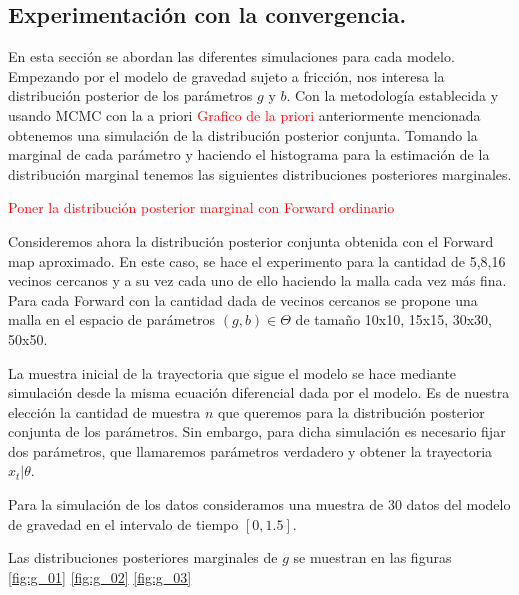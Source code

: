 \newpage

\newpage

\subsection{Experimentación con la convergencia.}

En esta sección se abordan las diferentes simulaciones para cada modelo. Empezando por el modelo de gravedad sujeto a fricción, nos interesa la distribución posterior de los parámetros $g$ y $b$. Con la metodología establecida y usando MCMC con la a priori \textcolor{red}{Grafico de la priori} anteriormente mencionada obtenemos una simulación de la distribución posterior conjunta. Tomando la marginal de cada parámetro y haciendo el histograma para la estimación de la distribución marginal tenemos las siguientes distribuciones posteriores marginales.


\textcolor{red}{Poner la distribución posterior marginal con Forward ordinario}

Consideremos ahora la distribución posterior conjunta obtenida con el Forward map aproximado. En este caso, se hace el experimento para la cantidad de 5,8,16 vecinos cercanos y a su vez cada uno de ello haciendo la malla cada vez más fina. Para cada Forward con la cantidad dada de vecinos cercanos se propone una malla en el espacio de parámetros $(g,b)\in \Theta$ de tamaño 10x10, 15x15, 30x30, 50x50.

La muestra inicial de la trayectoria que sigue el modelo se hace mediante simulación desde la misma ecuación diferencial dada por el modelo. Es de nuestra elección la cantidad de muestra $n$ que queremos para la distribución posterior conjunta de los parámetros. Sin embargo, para dicha simulación es necesario fijar dos parámetros, que llamaremos parámetros verdadero y obtener la trayectoria $x_t|\theta$. 

Para la simulación de los datos consideramos una muestra de 30 datos del modelo de gravedad en el intervalo de tiempo $[0,1.5]$. 

Las distribuciones posteriores marginales de $g$ se muestran en las figuras \ref{fig:g_01} \ref{fig:g_02}    \ref{fig:g_03} 



